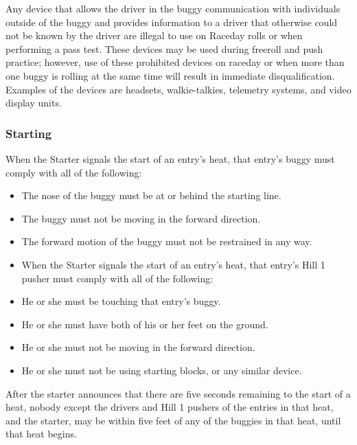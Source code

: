 	Any device that allows the driver in the buggy communication with individuals
	outside of the buggy and provides information to a driver that otherwise could
	not be known by the driver are illegal to use on Raceday rolls or when
	performing a pass test. These devices may be used during freeroll and push
	practice; however, use of these prohibited devices on raceday or when more than
	one buggy is rolling at the same time will result in immediate
	disqualification. Examples of the devices are headsets, walkie-talkies,
	telemetry systems, and video display units.

\subsubsection{Starting}

	When the Starter signals the start of an entry's heat, that entry's buggy must
	comply with all of the following:

	\begin{itemize}

		\item The nose of the buggy must be at or behind the starting line.

		\item The buggy must not be moving in the forward direction.

		\item The forward motion of the buggy must not be restrained in any way.

		\item When the Starter signals the start of an entry's heat, that entry's
		Hill 1 pusher must comply with all of the following:

		\item He or she must be touching that entry's buggy.

		\item He or she must have both of his or her feet on the ground.

		\item He or she must not be moving in the forward direction.

		\item He or she must not be using starting blocks, or any similar device.

	\end{itemize}

	After the starter announces that there are five seconds remaining to the start
	of a heat, nobody except the drivers and Hill 1 pushers of the entries in that
	heat, and the starter, may be within five feet of any of the buggies in that
	heat, until that heat begins.


